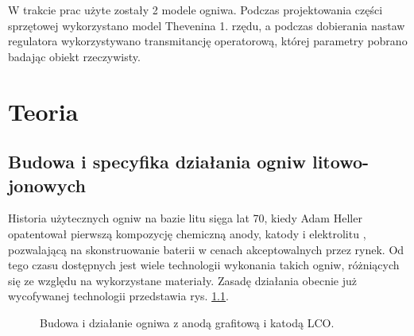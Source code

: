 \documentclass[polish,engineer]{polsl-msth}
\begin{document}
W trakcie prac użyte zostały 2 modele ogniwa. Podczas projektowania części sprzętowej wykorzystano model Thevenina 1. rzędu, a podczas dobierania nastaw regulatora wykorzystywano transmitancję operatorową, której parametry pobrano badając obiekt rzeczywisty. 


\chapter{Teoria}
\section{Budowa i specyfika działania ogniw litowo-jonowych}
Historia użytecznych ogniw na bazie litu sięga lat 70, kiedy Adam Heller opatentował pierwszą kompozycję chemiczną anody, katody i elektrolitu \cite{heller1975electrochemical}, pozwalającą na skonstruowanie baterii w cenach akceptowalnych przez rynek. Od tego czasu dostępnych jest wiele technologii wykonania takich ogniw, różniących się ze względu na wykorzystane materiały. Zasadę działania obecnie już wycofywanej technologii przedstawia rys. \ref{img:liion_structure}.
\begin{figure}[hbtp]
\centering
     \caption{Budowa i działanie ogniwa z anodą grafitową i katodą LCO. \cite{liionpic_wikimedia}  \label{img:liion_structure}}
\end{figure}
\end{document}
